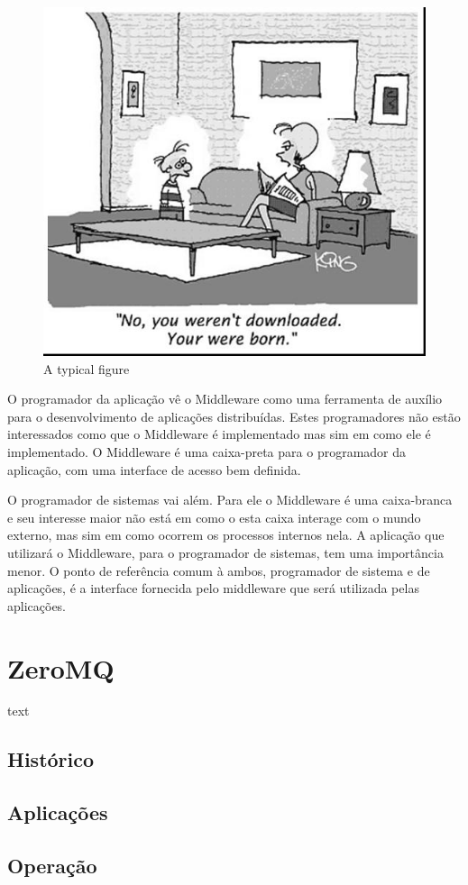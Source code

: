 \documentclass[12pt]{article}
\begin{document}
\begin{figure}[ht]
\centering
\includegraphics[width=.5\textwidth]{fig1.jpg}
\caption{A typical figure}
\label{fig:exampleFig1}
\end{figure}

O programador da aplicação vê o Middleware como uma ferramenta de auxílio para o
desenvolvimento de aplicações distribuídas. Estes programadores não estão interessados
como que o Middleware é implementado mas sim em como ele é implementado. O Middleware é
uma caixa-preta para o programador da aplicação, com uma interface de acesso bem definida.

O programador de sistemas vai além. Para ele o Middleware é uma caixa-branca e seu
interesse maior não está em como o esta caixa interage com o mundo externo, mas sim em
como ocorrem os processos internos nela. A aplicação que utilizará o Middleware, para o
programador de sistemas, tem uma importância menor. O ponto de referência comum à ambos,
programador de sistema e de aplicações, é a interface fornecida pelo middleware que será
utilizada pelas aplicações.

\section{ZeroMQ} \label{sec:firstpage}

text

\subsection{Histórico}
\subsection{Aplicações}
\subsection{Operação}
\end{document}
